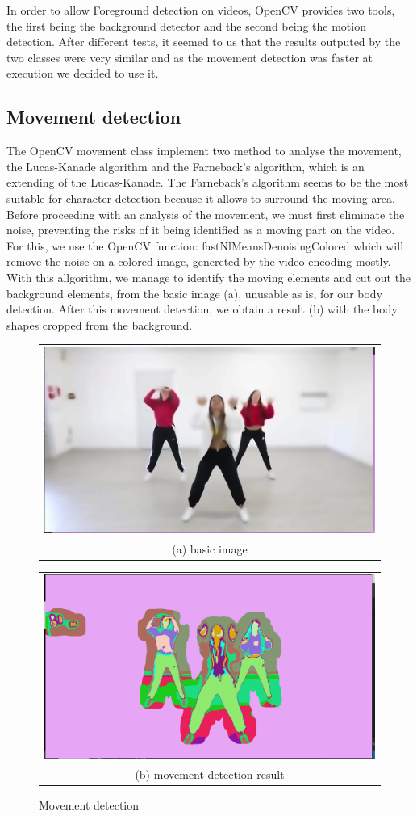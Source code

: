 \documentclass[conference]{IEEEtran}
\begin{document}
In order to allow Foreground detection on videos, OpenCV provides two tools, the first being the background detector and the second being the motion detection. After different tests, it seemed to us that the results outputed by the two classes were very similar and as the movement detection was faster at execution we decided to use it.

\subsection{Movement detection}
 
The OpenCV movement class implement two method to analyse the movement, the Lucas-Kanade algorithm and the Farneback’s algorithm, which is an extending of the Lucas-Kanade. The Farneback’s algorithm seems to be the most suitable for character detection because it allows to surround the moving area. Before proceeding with an analysis of the movement, we must first eliminate the noise, preventing the risks of it being identified as a moving part on the video. For this, we use the OpenCV function: fastNlMeansDenoisingColored which will remove the noise on a colored image, genereted by the video encoding mostly.
With this allgorithm, we manage to identify the moving elements and cut out the background elements, from the basic image (a), unusable as is, for our body detection.
After this movement detection, we obtain a result (b) with the body shapes cropped from the background.

\begin{figure}[h!]
  \centering
  \begin{tabular}{@{}c@{}}
    \includegraphics[width=0.4\linewidth]{fig5.png} \\[\abovecaptionskip]
    \small (a) basic image
  \end{tabular}
  \begin{tabular}{@{}c@{}}
    \includegraphics[width=0.4\linewidth]{fig6.png} \\[\abovecaptionskip]
    \small (b) movement detection result
  \end{tabular}
  \caption{Movement detection}
  \label{fig 3}
\end{figure}
\end{document}
